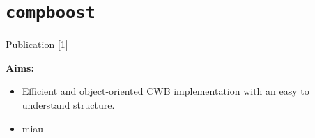 \documentclass[t,10pt]{beamer}
\begin{document}
\section*{\texttt{compboost}}

\begin{frame}{Publication [1]}
  \vspace{-0.2cm}
  \begin{figure}
    \centering
  \end{figure}
  \vspace{-0.4cm}

  \textbf{Aims:}
  \begin{itemize}
    \item
      Efficient and object-oriented CWB implementation with an easy to understand structure.
    \item
      miau
  \end{itemize}
\end{frame}
\end{document}
